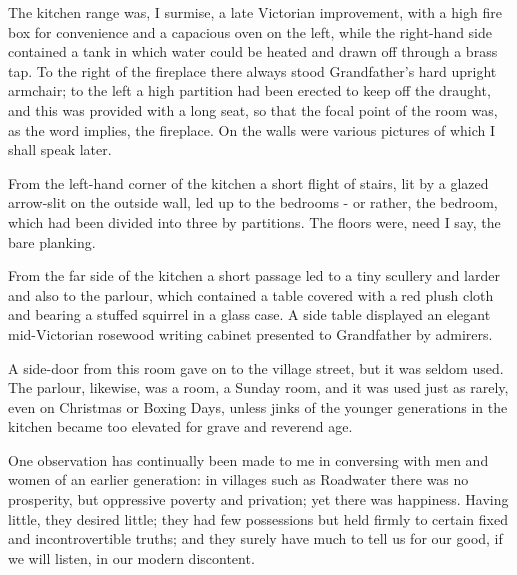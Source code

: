 The kitchen range was, I surmise, a late Victorian improvement, with a high fire box for convenience and a capacious oven on the left, while the right-hand side contained a tank in which water could be heated and drawn off through a brass tap. To the right of the fireplace there always stood Grandfather's hard upright armchair; to the left a high partition had been erected to keep off the draught, and this was provided with a long seat, so that the focal point of the room was, as the word implies, the fireplace. On the walls were various pictures of which I shall speak later.

From the left-hand corner of the kitchen a short flight of stairs, lit by a glazed arrow-slit on the outside wall, led up to the bedrooms - or rather, the bedroom, which had been divided into three by partitions. The floors were, need I say, the bare planking.

From the far side of the kitchen a short passage led to a tiny scullery and larder and also to the parlour, which contained a table covered with a red plush cloth and bearing a stuffed squirrel in a glass case. A side table displayed an elegant mid-Victorian rosewood writing cabinet presented to Grandfather by admirers.

A side-door from this room gave on to the village street, but it was seldom used. The parlour, likewise, was a  room, a Sunday room, and it was used just as rarely, even on Christmas or Boxing Days, unless jinks of the younger generations in the kitchen became too elevated for grave and reverend age.

\Flourish

One observation has continually been made to me in conversing with men and women of an earlier generation: in villages such as Roadwater there was no prosperity, but oppressive poverty and privation; yet there was happiness. Having little, they desired little; they had few possessions but held firmly to certain fixed and incontrovertible truths; and they surely have much to tell us for our good, if we will listen, in our modern discontent.
